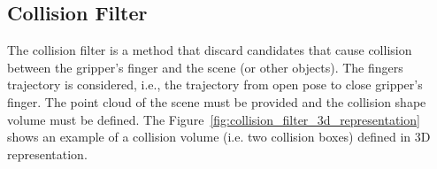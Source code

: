 \begin{snippet}[h!]
\centering
{}
\caption{Workspace filter pipeline descriptor example.}
\label{code:workspace_filter}
\end{snippet}


\subsection{Collision Filter}
\label{cap4:modular_grasping_architecture:sec:grasp_selection:subsec:collision_filter}

The collision filter is a method that discard candidates that cause collision between the gripper's finger and the scene (or other objects). The fingers trajectory is considered, i.e., the trajectory from open pose to close gripper's finger. The point cloud of the scene must be provided and the collision shape volume must be defined. The Figure~\ref{fig:collision_filter_3d_representation} shows an example of a collision volume (i.e. two collision boxes) defined in 3D representation.


\begin{figure}[h!] %
\end{figure}

